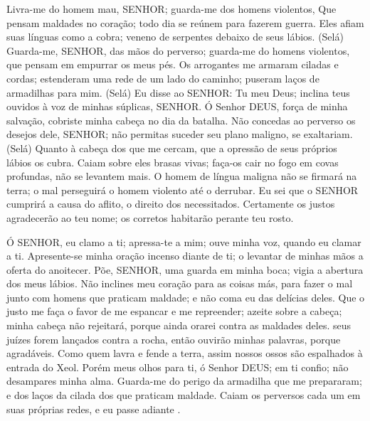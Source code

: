 
{\PP 
  Livra-me do homem mau, SENHOR; guarda-me dos homens violentos,
  Que pensam maldades no coração; todo dia se reúnem para fazerem guerra.
  Eles afiam suas línguas como a cobra; veneno de serpentes
{} debaixo de seus lábios. (Selá)
  Guarda-me, SENHOR, das mãos do perverso; guarda-me do homens violentos, que pensam em empurrar os meus pés.
  Os arrogantes me armaram ciladas e cordas; estenderam uma rede de um lado do caminho;
{} puseram laços de armadilhas para mim. (Selá)
  Eu disse ao SENHOR: Tu
{} meu Deus; inclina teus ouvidos à voz de minhas súplicas, SENHOR.
  Ó Senhor DEUS, força de minha salvação, cobriste minha cabeça no dia da batalha.
  Não concedas ao perverso os desejos dele, SENHOR; não permitas suceder seu plano maligno,
{} se exaltariam. (Selá)
  Quanto à cabeça dos que me cercam, que a opressão de seus próprios lábios os cubra.
  Caiam sobre eles brasas vivas; faça-os cair no fogo
{} em covas profundas,
{} não se levantem mais.
  O homem de língua maligna não se firmará na terra; o mal perseguirá o homem violento até o derrubar.
  Eu sei que o SENHOR cumprirá a causa do aflito, o direito dos necessitados.
  Certamente os justos agradecerão ao teu nome; os corretos habitarão perante teu rosto.
\par }


{\PP 
  Ó SENHOR, eu clamo a ti; apressa-te a mim; ouve minha voz, quando eu clamar a ti.
  Apresente-se minha oração
{} incenso diante de ti;
{} o levantar de minhas mãos
{} a oferta do anoitecer.
  Põe, SENHOR, uma guarda em minha boca; vigia a abertura dos meus lábios.
  Não inclines meu coração para as coisas más, para fazer o mal junto com homens que praticam maldade; e não coma eu das delícias deles.
  Que o justo me faça o favor de me espancar e me repreender;
{} azeite sobre a cabeça; minha cabeça não rejeitará, porque ainda orarei contra as maldades deles.
   seus juízes forem lançados contra a rocha, então ouvirão minhas palavras, porque
{} agradáveis.
  Como quem lavra e fende a terra, assim nossos ossos são espalhados à entrada do Xeol.
  Porém meus olhos
{} para ti, ó Senhor DEUS; em ti confio; não desampares minha alma.
  Guarda-me do perigo da armadilha que me prepararam; e dos laços da cilada dos que praticam maldade.
  Caiam os perversos cada um em suas próprias redes, e eu passe adiante
{} .
\par }


